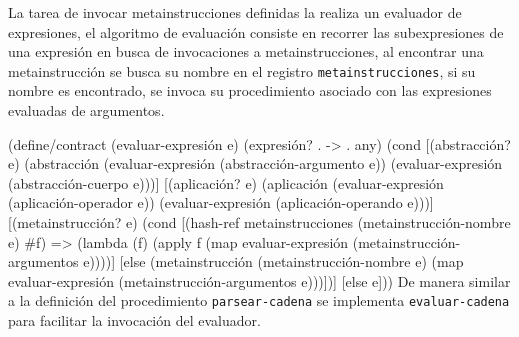 \documentclass[10pt,oneside,openany,letterpaper]{book}
\begin{document}
La tarea de invocar metainstrucciones definidas la realiza un evaluador de expresiones, el algoritmo de evaluación consiste en recorrer las subexpresiones de una expresión en busca de invocaciones a metainstrucciones, al encontrar una metainstrucción se busca su nombre en el registro {\tt{}\protect{}metainstrucciones}, si su nombre es encontrado, se invoca su procedimiento asociado con las expresiones evaluadas de argumentos.

\nwenddocs{}\endmoddef
(define/contract (evaluar-expresión e)
  (expresión? . -> . any)
  (cond [(abstracción? e)
         (abstracción (evaluar-expresión (abstracción-argumento e))
                      (evaluar-expresión (abstracción-cuerpo e)))]
        [(aplicación? e)
         (aplicación (evaluar-expresión (aplicación-operador e))
                     (evaluar-expresión (aplicación-operando e)))]
        [(metainstrucción? e)
         (cond [(hash-ref metainstrucciones (metainstrucción-nombre e) #f) =>
                (lambda (f)
                  (apply f (map evaluar-expresión (metainstrucción-argumentos e))))]
               [else
                (metainstrucción (metainstrucción-nombre e)
                                 (map evaluar-expresión
                                      (metainstrucción-argumentos e)))])]
        [else e]))
\eatline
{}\nwendcode{}\nwdocspar
De manera similar a la definición del procedimiento {\tt{}\protect{}parsear\protect{}-cadena} se implementa {\tt{}\protect{}evaluar-cadena} para facilitar la invocación del evaluador.
\end{document}
